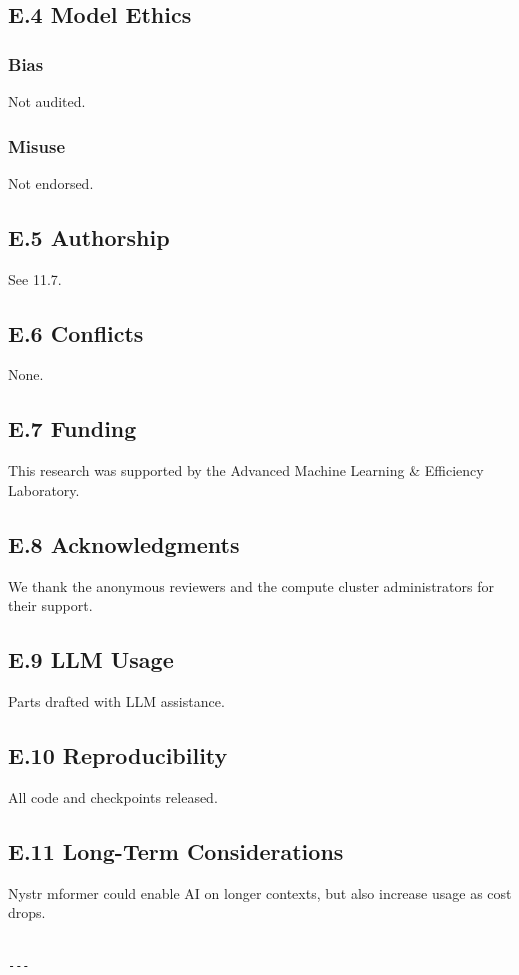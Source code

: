 \subsection{E.4 Model Ethics}

\subsubsection{Bias}
Not audited.

\subsubsection{Misuse}
Not endorsed.

\subsection{E.5 Authorship}
See  11.7.

\subsection{E.6 Conflicts}
None.

\subsection{E.7 Funding}
This research was supported by the Advanced Machine Learning \& Efficiency Laboratory.

\subsection{E.8 Acknowledgments}
We thank the anonymous reviewers and the compute cluster administrators for their support.

\subsection{E.9 LLM Usage}
Parts drafted with LLM assistance.

\subsection{E.10 Reproducibility}
All code and checkpoints released.

\subsection{E.11 Long-Term Considerations}
Nystr mformer could enable AI on longer contexts, but also increase usage 
as cost drops.
\begin{lstlisting}

---
\end{lstlisting}


